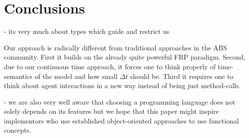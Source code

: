 \section{Conclusions}
- its very much about types which guide and restrict us

Our approach is radically different from traditional approaches in the ABS community. First it builds on the already quite powerful FRP paradigm. Second, due to our continuous time approach, it forces one to think properly of time-semantics of the model and how small $\Delta t$ should be. Third it requires one to think about agent interactions in a new way instead of being just method-calls.

- we are also very well aware that choosing a programming language does not solely depends on its features but we hope that this paper might inspire implementors who use established object-oriented approaches to use functional concepts.

